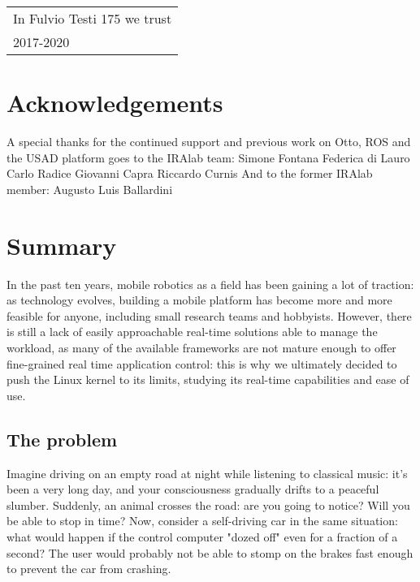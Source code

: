 \documentclass[a4paper,12pt]{report}
\begin{document}

\newpage
\begin{flushright}
  \itshape
  \begin{tabular}{@{}l@{}}
    In Fulvio Testi 175 we trust \\
    2017-2020
  \end{tabular}
\end{flushright}
\newpage
\tableofcontents
\newpage
\chapter*{Acknowledgements}
A special thanks for the continued support and previous work on Otto, ROS and the USAD platform goes to the IRAlab team:
Simone Fontana
Federica di Lauro
Carlo Radice 
Giovanni Capra
Riccardo Curnis
And to the former IRAlab member:
Augusto Luis Ballardini

\chapter{Summary}

In the past ten years, mobile robotics as a field has been gaining a lot of traction: as technology evolves, building a mobile platform has become more and more feasible for anyone, including small research teams and hobbyists. However, there is still a lack of easily approachable real-time solutions able to manage the workload, as many of the available frameworks are not mature enough to offer fine-grained real time application control: this is why we ultimately decided to push the Linux kernel to its limits, studying its real-time capabilities and ease of use.

\section{The problem}

Imagine driving on an empty road at night while listening to classical music: it's been a very long day, and your consciousness gradually drifts to a peaceful slumber. Suddenly, an animal crosses the road: are you going to notice? Will you be able to stop in time? Now, consider a self-driving car in the same situation: what would happen if the control computer "dozed off" even for a fraction of a second? The user would probably not be able to stomp on the brakes fast enough to prevent the car from crashing.
\end{document}

